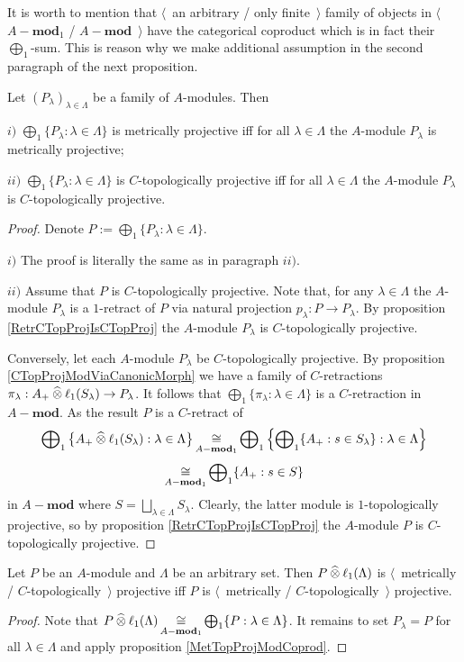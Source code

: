 It is worth to mention that $\langle$~an arbitrary / only finite~$\rangle$ family of objects in $\langle$~$A-\mathbf{mod}_1$ / $A-\mathbf{mod}$~$\rangle$ have the categorical coproduct which is in fact their $\bigoplus_1$-sum. This is reason why we make additional assumption in the second paragraph of the next proposition.

\begin{proposition}\label{MetTopProjModCoprod} Let $(P_\lambda)_{\lambda\in\Lambda}$ be a family of $A$-modules. Then 

$i)$ $\bigoplus_1\{P_\lambda:\lambda\in\Lambda\}$ is metrically projective iff for all $\lambda\in\Lambda$ the $A$-module $P_\lambda$ is metrically projective;

$ii)$ $\bigoplus_1\{P_\lambda:\lambda\in\Lambda\}$ is $C$-topologically projective iff for all $\lambda\in\Lambda$ the $A$-module $P_\lambda$ is $C$-topologically projective.
\end{proposition}
\begin{proof} Denote $P:=\bigoplus_1\{P_\lambda:\lambda\in\Lambda\}$.

$i)$ The proof is literally the same as in paragraph $ii)$.

$ii)$ Assume that $P$ is $C$-topologically projective. Note that, for any $\lambda\in\Lambda$ the $A$-module $P_\lambda$ is a $1$-retract of $P$ via natural projection $p_\lambda:P\to P_\lambda$. By proposition \ref{RetrCTopProjIsCTopProj} the $A$-module $P_\lambda$ is $C$-topologically projective.

Conversely, let each $A$-module $P_\lambda$ be $C$-topologically projective. By proposition \ref{CTopProjModViaCanonicMorph} we have a family of $C$-retractions $\pi_\lambda:A_+\mathbin{\widehat{\otimes}}\ell_1(S_\lambda)\to P_\lambda$. It follows that $\bigoplus_1\{\pi_\lambda:\lambda\in\Lambda\}$ is a $C$-retraction in $A-\mathbf{mod}$. As the result $P$ is a $C$-retract of 
$$
\bigoplus\nolimits_1\left\{A_+\mathbin{\widehat{\otimes}} \ell_1(S_\lambda):\lambda\in\Lambda\right\}
\mathop{\mathbin{\cong}}\limits_{A-\mathbf{mod}_1}
\bigoplus\nolimits_1\left\{\bigoplus\nolimits_1\{A_+:s\in S_\lambda\}:\lambda\in\Lambda\right\}
$$
$$
\mathop{\mathbin{\cong}}\limits_{A-\mathbf{mod}_1}
\bigoplus\nolimits_1\{A_+:s\in S\}
$$
in $A-\mathbf{mod}$ where $S=\bigsqcup_{\lambda\in\Lambda}S_\lambda$. Clearly, the latter module is $1$-topologically projective, so by proposition \ref{RetrCTopProjIsCTopProj} the $A$-module $P$ is $C$-topologically projective.
\end{proof}

\begin{corollary}\label{MetTopProjTensProdWithl1} Let $P$ be an $A$-module and $\Lambda$ be an arbitrary set. Then $P\mathbin{\widehat{\otimes}} \ell_1(\Lambda)$ is $\langle$~metrically / $C$-topologically~$\rangle$ projective iff $P$ is $\langle$~metrically / $C$-topologically~$\rangle$ projective.
\end{corollary}
\begin{proof} 
Note that $P\mathbin{\widehat{\otimes}} \ell_1(\Lambda)\mathop{\mathbin{\cong}}\limits_{A-\mathbf{mod}_1}\bigoplus_1\{P:\lambda\in\Lambda\}$. It remains to set $P_\lambda=P$ for all $\lambda\in\Lambda$ and apply proposition \ref{MetTopProjModCoprod}.
\end{proof}

